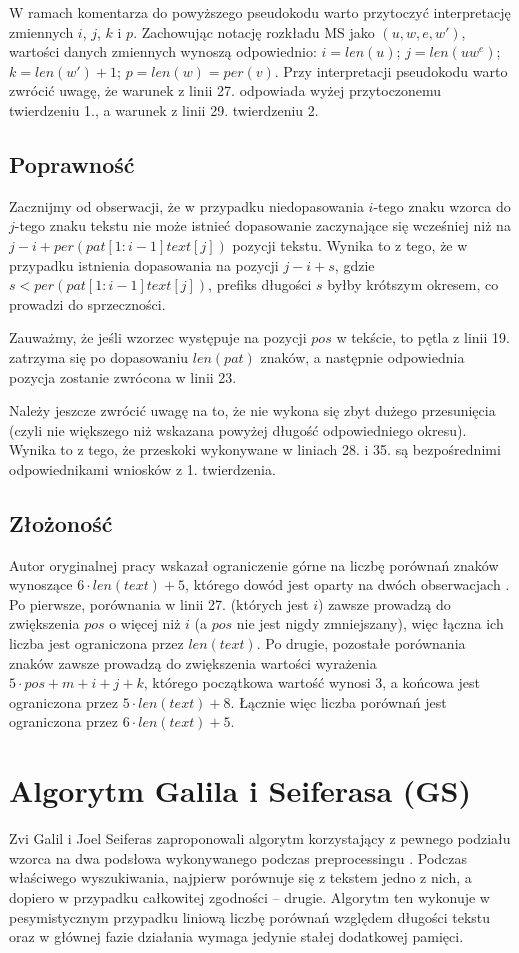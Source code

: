 \newpage
W ramach komentarza do powyższego pseudokodu warto przytoczyć interpretację zmiennych $i$, $j$, $k$ i $p$. Zachowując notację rozkładu MS jako $(u, w, e, w')$, wartości danych zmiennych wynoszą odpowiednio: $i=len(u)$; $j=len(uw^{e})$; $k=len(w')+1$; $p=len(w)=per(v)$. Przy interpretacji pseudokodu warto zwrócić uwagę, że warunek z linii 27. odpowiada wyżej przytoczonemu twierdzeniu 1., a warunek z linii 29. twierdzeniu 2.

\subsection{Poprawność}
Zacznijmy od obserwacji, że w przypadku niedopasowania $i$-tego znaku wzorca do $j$-tego znaku tekstu nie może istnieć dopasowanie zaczynające się wcześniej niż na $j-i+per(pat[1:i-1]text[j])$ pozycji tekstu. Wynika to z tego, że w przypadku istnienia dopasowania na pozycji $j-i+s$, gdzie $s < per(pat[1:i-1]text[j])$, prefiks długości $s$ byłby krótszym okresem, co prowadzi do sprzeczności.

Zauważmy, że jeśli wzorzec występuje na pozycji $pos$ w tekście, to pętla z linii 19. zatrzyma się po dopasowaniu $len(pat)$ znaków, a następnie odpowiednia pozycja zostanie zwrócona w linii 23. 

Należy jeszcze zwrócić uwagę na to, że nie wykona się zbyt dużego przesunięcia (czyli nie większego niż wskazana powyżej długość odpowiedniego okresu). Wynika to z tego, że przeskoki wykonywane w liniach 28. i 35. są bezpośrednimi odpowiednikami wniosków z 1. twierdzenia.

\subsection{Złożoność}
Autor oryginalnej pracy wskazał ograniczenie górne na liczbę porównań znaków wynoszące $6 \cdot len(text) + 5$, którego dowód jest oparty na dwóch obserwacjach \cite{Cr-or}. Po pierwsze, porównania w linii 27. (których jest $i$) zawsze prowadzą do zwiększenia $pos$ o więcej niż $i$ (a $pos$ nie jest nigdy zmniejszany), więc łączna ich liczba jest ograniczona przez $len(text)$. Po drugie, pozostałe porównania znaków zawsze prowadzą do zwiększenia wartości wyrażenia $5 \cdot pos + m + i + j + k$, którego początkowa wartość wynosi $3$, a końcowa jest ograniczona przez $5 \cdot len(text) + 8$. Łącznie więc liczba porównań jest ograniczona przez $6 \cdot len(text) + 5$.

\newpage
\section{Algorytm Galila i Seiferasa (GS)}
Zvi Galil i Joel Seiferas zaproponowali algorytm korzystający z pewnego podziału wzorca na dwa podsłowa wykonywanego podczas preprocessingu \cite{GS}. Podczas właściwego wyszukiwania, najpierw porównuje się z tekstem jedno z nich, a dopiero w przypadku całkowitej zgodności -- drugie. Algorytm ten wykonuje w pesymistycznym przypadku liniową liczbę porównań względem długości tekstu oraz w głównej fazie działania wymaga jedynie stałej dodatkowej pamięci.

